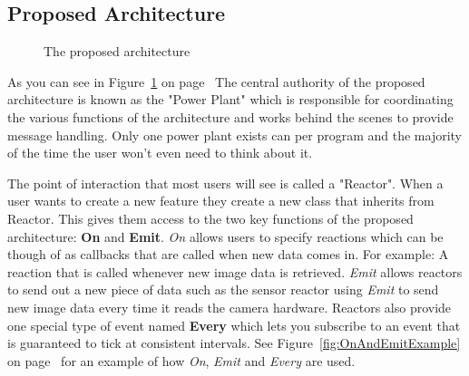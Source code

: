 \documentclass[english,12pt]{scrartcl}
\begin{document}
        \subsection{Proposed Architecture}
            \begin{figure}[h]
                \centering
                \caption {The proposed architecture}
                \label{fig:HighLevelProposedArchitecture}
            \end{figure}

            As you can see in Figure~\ref{fig:HighLevelProposedArchitecture} on
            page~\pageref{fig:HighLevelProposedArchitecture} 
            The central authority of the proposed architecture is known as the "Power Plant" which
            is responsible for coordinating the various functions of the architecture and works
            behind the scenes to provide message handling. Only one power plant exists can per
            program and the majority of the time the user won't even need to think about it. 
            
            The point of interaction that most users will see is called a "Reactor". When a user
            wants to create a new feature they create a new class that inherits from Reactor. This
            gives them access to the two key functions of the proposed architecture: \textbf{On} and
            \textbf{Emit}. \emph{On} allows users to specify reactions which can be though of as
            callbacks that are called when new data comes in. For example: A reaction that is called
            whenever new image data is retrieved. \emph{Emit} allows reactors to send out a new
            piece of data such as the sensor reactor using \emph{Emit} to send new image data every
            time it reads the camera hardware. Reactors also provide one special type of event named
            \textbf{Every} which lets you subscribe to an event that is guaranteed to tick at
            consistent intervals. See Figure~\ref{fig:OnAndEmitExample} on
            page~\pageref{fig:OnAndEmitExample} for an example of how \emph{On}, \emph{Emit} and
            \emph{Every} are used.
            
\end{document}
